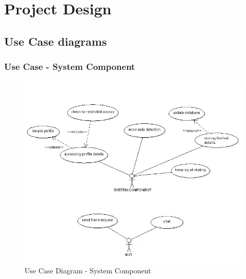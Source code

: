 \chapter{Project Design}


\section{Use Case diagrams}
\subsection{Use Case - System Component}


\begin{figure}[H]
\centering
\includegraphics[scale=0.7]{project/diagrams/usecase1}
\caption{Use Case Diagram - System Component}
\label{fig:usecase1}
\end{figure}


